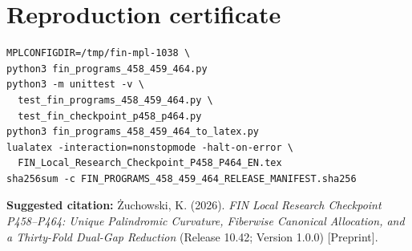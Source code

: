 \documentclass[11pt,a4paper,openany]{report}
\begin{document}
\clearpage\chapter*{Reproduction certificate}
\begin{Verbatim}[fontsize=\small]
MPLCONFIGDIR=/tmp/fin-mpl-1038 \
python3 fin_programs_458_459_464.py
python3 -m unittest -v \
  test_fin_programs_458_459_464.py \
  test_fin_checkpoint_p458_p464.py
python3 fin_programs_458_459_464_to_latex.py
lualatex -interaction=nonstopmode -halt-on-error \
  FIN_Local_Research_Checkpoint_P458_P464_EN.tex
sha256sum -c FIN_PROGRAMS_458_459_464_RELEASE_MANIFEST.sha256
\end{Verbatim}
\noindent\textbf{Suggested citation:}
\.Zuchowski, K. (2026). \emph{FIN Local Research Checkpoint P458--P464:
Unique Palindromic Curvature, Fiberwise Canonical Allocation, and a Thirty-Fold
Dual-Gap Reduction} (Release 10.42; Version 1.0.0) [Preprint].
\end{document}
